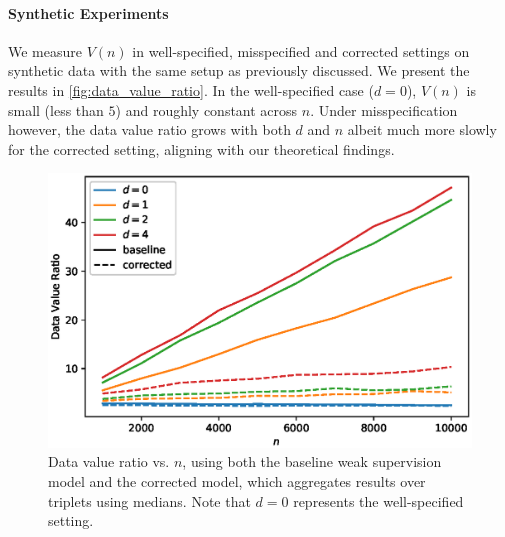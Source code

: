 \paragraph{Synthetic Experiments} We measure $V(n)$ in well-specified, misspecified and corrected settings on synthetic data with the same setup as previously discussed. 
We present the results in \autoref{fig:data_value_ratio}. In the well-specified case ($d = 0$), $V(n)$ is small (less than $5$) and roughly constant across $n$. Under misspecification however, the data value ratio grows with both $d$ and $n$ albeit much more slowly for the corrected setting, aligning with our theoretical findings. 

\begin{figure}
    \centering
    \includegraphics[width=.4\textwidth]{eps_figures/data_value_ratio_vs_n.eps}
    \caption{Data value ratio vs. $n$, using both the baseline weak supervision model and the corrected model, which aggregates results over triplets using medians. Note that $d=0$ represents the well-specified setting. %
    }
    \label{fig:data_value_ratio}
\end{figure}

